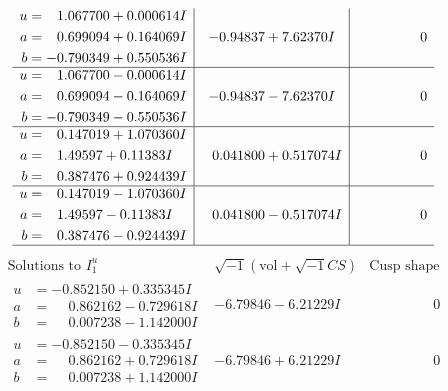 \documentclass[1p]{elsarticle_modified}
\theoremstyle{definition}
\newcommand{\I}{\sqrt{-1}}
\begin{document}
$$\begin{array}{c|c|c}
\begin{aligned}
u &= \phantom{-}1.067700 + 0.000614 I \\
a &= \phantom{-}0.699094 + 0.164069 I \\
b &= -0.790349 + 0.550536 I\end{aligned}
 & -0.94837 + 7.62370 I & \phantom{-0.000000 } 0 \\ \hline\begin{aligned}
u &= \phantom{-}1.067700 - 0.000614 I \\
a &= \phantom{-}0.699094 - 0.164069 I \\
b &= -0.790349 - 0.550536 I\end{aligned}
 & -0.94837 - 7.62370 I & \phantom{-0.000000 } 0 \\ \hline\begin{aligned}
u &= \phantom{-}0.147019 + 1.070360 I \\
a &= \phantom{-}1.49597 + 0.11383 I \\
b &= \phantom{-}0.387476 + 0.924439 I\end{aligned}
 & \phantom{-}0.041800 + 0.517074 I & \phantom{-0.000000 } 0 \\ \hline\begin{aligned}
u &= \phantom{-}0.147019 - 1.070360 I \\
a &= \phantom{-}1.49597 - 0.11383 I \\
b &= \phantom{-}0.387476 - 0.924439 I\end{aligned}
 & \phantom{-}0.041800 - 0.517074 I & \phantom{-0.000000 } 0\\
 \hline 
 \end{array}$$\newpage$$\begin{array}{c|c|c}  
\text{Solutions to }I^u_{1}& \I (\text{vol} + \sqrt{-1}CS) & \text{Cusp shape}\\
 \hline 
\begin{aligned}
u &= -0.852150 + 0.335345 I \\
a &= \phantom{-}0.862162 - 0.729618 I \\
b &= \phantom{-}0.007238 - 1.142000 I\end{aligned}
 & -6.79846 - 6.21229 I & \phantom{-0.000000 } 0 \\ \hline\begin{aligned}
u &= -0.852150 - 0.335345 I \\
a &= \phantom{-}0.862162 + 0.729618 I \\
b &= \phantom{-}0.007238 + 1.142000 I\end{aligned}
 & -6.79846 + 6.21229 I & \phantom{-0.000000 } 0 \\ \hline\begin{aligned}

\end{aligned}
\end{array}$$
\end{document}
